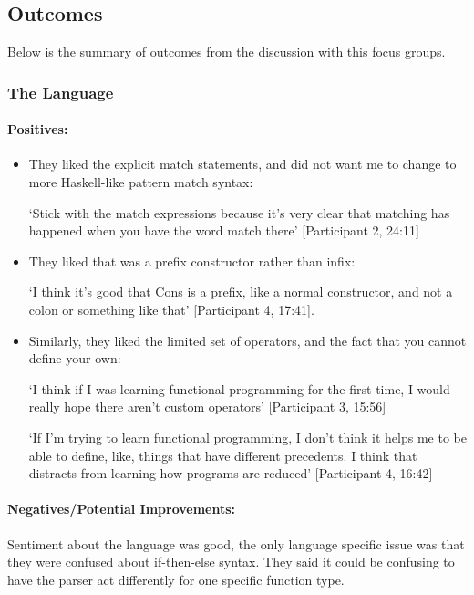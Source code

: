 \subsection{Outcomes}
Below is the summary of outcomes from the discussion with this focus groups. 

\subsubsection{The Language}
\paragraph{Positives:}
\begin{itemize}
    \item They liked the explicit match statements, and did not want me to change to more Haskell-like pattern match syntax: 
    
    `Stick with the match expressions because it's very clear that matching has happened when you have the word match there' [Participant 2, 24:11]
    \item They liked that  was a prefix constructor rather than infix: 
    
    `I think it's good that Cons is a prefix, like a normal constructor, and not a colon or
    something like that' [Participant 4, 17:41]. 
    \item Similarly, they liked the limited set of operators, and the fact that you cannot define your own: 
    
    `I think if I was learning functional programming for the first time, I would really hope there aren't custom operators' [Participant 3, 15:56]
    
    `If I'm trying to learn functional programming, I don't think it helps me to be able to define, like, things that have different precedents. I think that distracts from learning how programs are reduced' [Participant 4, 16:42]
\end{itemize}

\paragraph{Negatives/Potential Improvements:}
\label{ref:afg_ite} 
Sentiment about the language was good, the only language specific issue was that they were confused about if-then-else syntax. They said it could be confusing to have the parser act differently for one specific function type. 

